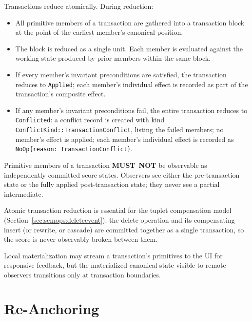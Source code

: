 \documentclass[11pt,letterpaper]{report}
\newcounter{requirement}[chapter]
\newcommand{\MUSTNOT}{\textbf{MUST}\nobreak\ \textbf{NOT}}
\begin{document}
\begin{requirement}
  \label{req:semops:atomic-transaction-reduction}
  Transactions reduce atomically. During reduction:

  \begin{itemize}
    \item All primitive members of a transaction are gathered into
      a transaction block at the point of the earliest member's
      canonical position.
    \item The block is reduced as a single unit. Each member is
      evaluated against the working state produced by prior members
      within the same block.
    \item If every member's invariant preconditions are satisfied,
      the transaction reduces to \texttt{Applied}; each member's
      individual effect is recorded as part of the transaction's
      composite effect.
    \item If any member's invariant preconditions fail, the entire
      transaction reduces to \texttt{Conflicted}: a conflict record
      is created with kind
      \texttt{ConflictKind::TransactionConflict}, listing the
      failed members; no member's effect is applied; each member's
      individual effect is recorded as
      \texttt{NoOp\{reason: TransactionConflict\}}.
  \end{itemize}

  Primitive members of a transaction \MUSTNOT{} be observable as
  independently committed score states. Observers see either the
  pre-transaction state or the fully applied post-transaction
  state; they never see a partial intermediate.
\end{requirement}

\begin{rationale}
  Atomic transaction reduction is essential for the tuplet
  compensation model (Section~\ref{sec:semops:deleteevent}): the
  delete operation and its compensating insert (or rewrite, or
  cascade) are committed together as a single transaction, so the
  score is never observably broken between them.

  Local materialization may stream a transaction's primitives to the
  UI for responsive feedback, but the materialized canonical state
  visible to remote observers transitions only at transaction
  boundaries.
\end{rationale}

\section{Re-Anchoring}
\label{sec:semops:reanchor}
\end{document}
